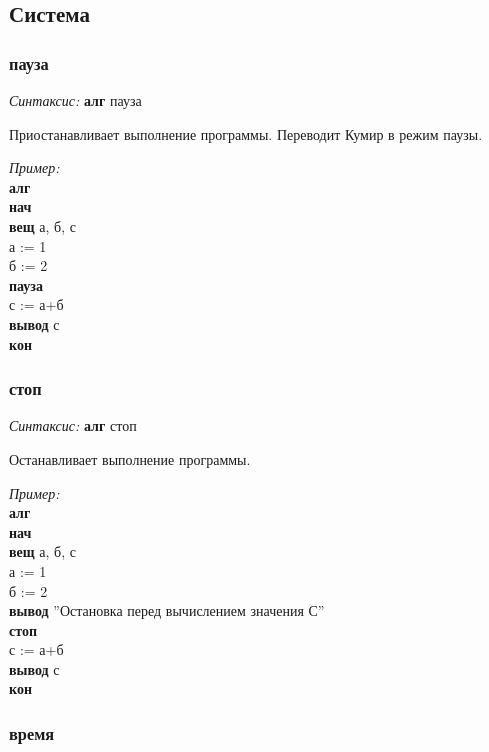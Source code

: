 \subsection{Система}

\subsubsection{пауза}

\emph{Синтаксис:} \textbf{алг} пауза


      
       Приостанавливает выполнение программы. Переводит Кумир в режим паузы.
      
\emph{Пример:}      
\sffamily~\\
\textbf{алг}\\ 
\textbf{нач}\\ 
\otstup \textbf{вещ} а, б, с~\\ 
\otstup а := 1~\\ 
\otstup б := 2~\\ 
\otstup \textbf{пауза}~\\ 
\otstup с := а+б~\\ 
\otstup \textbf{вывод} с~\\ 
\textbf{кон}      
  
\normalfont
\subsubsection{стоп}

\emph{Синтаксис:} \textbf{алг} стоп


      
       Останавливает выполнение программы.
      
\emph{Пример:}      
\sffamily~\\
\textbf{алг}\\ 
\textbf{нач}\\
\otstup \textbf{вещ} а, б, с~\\
\otstup а := 1~\\
\otstup б := 2~\\
\otstup \textbf{вывод} ''Остановка перед вычислением значения С''~\\
\otstup \textbf{стоп}~\\
\otstup с := а+б~\\
\otstup \textbf{вывод} с~\\
\textbf{кон}~\\      
  
\normalfont
\subsubsection{время}

